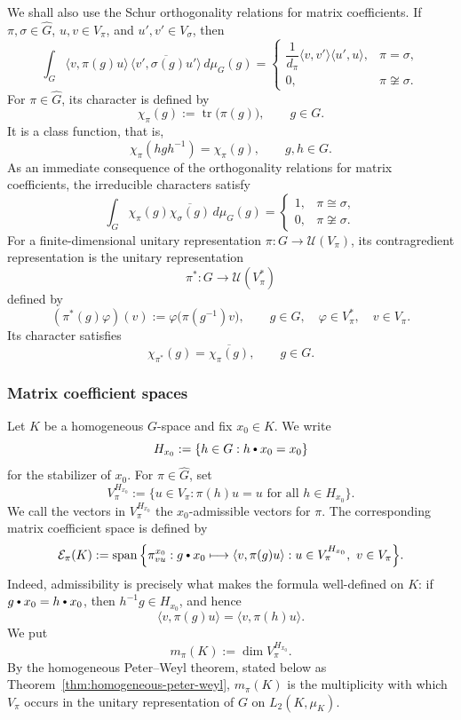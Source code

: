 \documentclass[11pt,showkeys]{amsart}
\newcommand{\hbullet}{\mathbin{\vcenter{\hbox{\scalebox{0.7}{$\bullet$}}}}}
\begin{document}
We shall also use the Schur orthogonality relations for matrix
coefficients. If \(\pi,\sigma\in\widehat G\), \(u,v\in V_\pi\), and
\(u',v'\in V_\sigma\), then
\[
    \int_G
    \langle v,\pi(g)u\rangle\,
    \overline{\langle v',\sigma(g)u'\rangle}
    \,d\mu_G(g)
    =
    \begin{cases}
        \dfrac{1}{d_\pi}
        \langle v,v'\rangle
        \langle u',u\rangle,
        & \pi=\sigma,\\[6pt]
        0,
        & \pi\not\cong\sigma.
    \end{cases}
\]
For \(\pi\in\widehat G\), its character is defined by
\[
    \chi_\pi(g):=\operatorname{tr}\bigl(\pi(g)\bigr),
    \qquad g\in G.
\]
It is a class function, that is,
\[
    \chi_\pi(hgh^{-1})=\chi_\pi(g),
    \qquad g,h\in G.
\]
As an immediate consequence of the orthogonality relations for matrix
coefficients, the irreducible characters satisfy
\[
    \int_G
    \chi_\pi(g)\overline{\chi_\sigma(g)}
    \,d\mu_G(g)
    =
    \begin{cases}
        1, & \pi\cong\sigma,\\
        0, & \pi\not\cong\sigma.
    \end{cases}
\]
For a finite-dimensional unitary representation
\(\pi\colon G\to\mathcal U(V_\pi)\), its contragredient representation
is the unitary representation
\[
    \pi^*\colon G\longrightarrow\mathcal U(V_\pi^*)
\]
defined by
\[
    (\pi^*(g)\varphi)(v)
    :=
    \varphi\bigl(\pi(g^{-1})v\bigr),
    \qquad
    g\in G,\quad
    \varphi\in V_\pi^*,\quad
    v\in V_\pi.
\]
Its character satisfies
\[
    \chi_{\pi^*}(g)
    =
    \overline{\chi_\pi(g)},
    \qquad g\in G.
\]


\subsubsection{Matrix coefficient spaces}

Let \(K\) be a homogeneous \(G\)-space and fix \(x_0\in K\). We write
\[
        H_{x_0}:=\{h\in G:h\hbullet x_0=x_0\}
\]
for the stabilizer of \(x_0\). For \(\pi\in\widehat G\), set
\[
        V_\pi^{H_{x_0}}
        :=
        \{u\in V_\pi:\pi(h)u=u\text{ for all }h\in H_{x_0}\}.
\]
We call the vectors in \(V_\pi^{H_{x_0}}\) the \(x_0\)-admissible vectors
for \(\pi\). The corresponding matrix coefficient space is defined by
\[
        \mathcal E_\pi(K)
        :=
        \operatorname{span}
        \Big\{
        \pi^{x_0}_{vu}:g\hbullet x_0\longmapsto
        \langle v,\pi(g)u\rangle
        :
        u\in V_\pi^{H_{x_0}},\ v\in V_\pi
        \Big\}.
\]
Indeed, admissibility is precisely what makes the formula well-defined on
\(K\): if \(g\hbullet x_0=h\hbullet x_0\), then \(h^{-1}g\in H_{x_0}\), and
hence
\[
        \langle v,\pi(g)u\rangle
        =
        \langle v,\pi(h)u\rangle .
\]
We put
\[
        m_\pi(K):=\dim V_\pi^{H_{x_0}}.
\]
By the homogeneous Peter--Weyl theorem, stated below as
Theorem~\ref{thm:homogeneous-peter-weyl}, \(m_\pi(K)\) is the multiplicity with which
\(V_\pi\) occurs in the unitary representation of \(G\) on
\(L_2(K,\mu_K)\).
\end{document}
